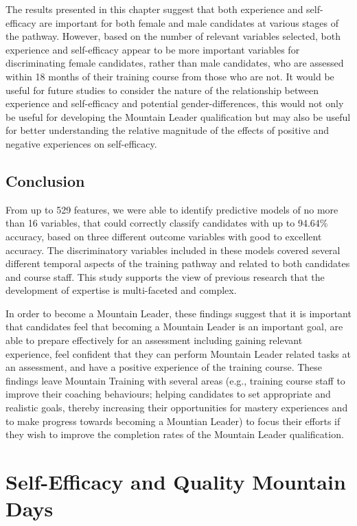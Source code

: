 \documentclass[
  12pt,
  a4paper,
]{book}
\begin{document}
The results presented in this chapter suggest that both experience and self-efficacy are important for both female and male candidates at various stages of the pathway. However, based on the number of relevant variables selected, both experience and self-efficacy appear to be more important variables for discriminating female candidates, rather than male candidates, who are assessed within 18 months of their training course from those who are not. It would be useful for future studies to consider the nature of the relationship between experience and self-efficacy and potential gender-differences, this would not only be useful for developing the Mountain Leader qualification but may also be useful for better understanding the relative magnitude of the effects of positive and negative experiences on self-efficacy.

\hypertarget{conclusion}{%
\section{Conclusion}\label{conclusion}}

From up to 529 features, we were able to identify predictive models of no more than 16 variables, that could correctly classify candidates with up to 94.64\% accuracy, based on three different outcome variables with good to excellent accuracy. The discriminatory variables included in these models covered several different temporal aspects of the training pathway and related to both candidates and course staff. This study supports the view of previous research that the development of expertise is multi-faceted and complex.

In order to become a Mountain Leader, these findings suggest that it is important that candidates feel that becoming a Mountain Leader is an important goal, are able to prepare effectively for an assessment including gaining relevant experience, feel confident that they can perform Mountain Leader related tasks at an assessment, and have a positive experience of the training course. These findings leave Mountain Training with several areas (e.g., training course staff to improve their coaching behaviours; helping candidates to set appropriate and realistic goals, thereby increasing their opportunities for mastery experiences and to make progress towards becoming a Mountian Leader) to focus their efforts if they wish to improve the completion rates of the Mountain Leader qualification.

\hypertarget{self-efficacy-qmds}{%
\chapter{Self-Efficacy and Quality Mountain Days}\label{self-efficacy-qmds}}
\end{document}
